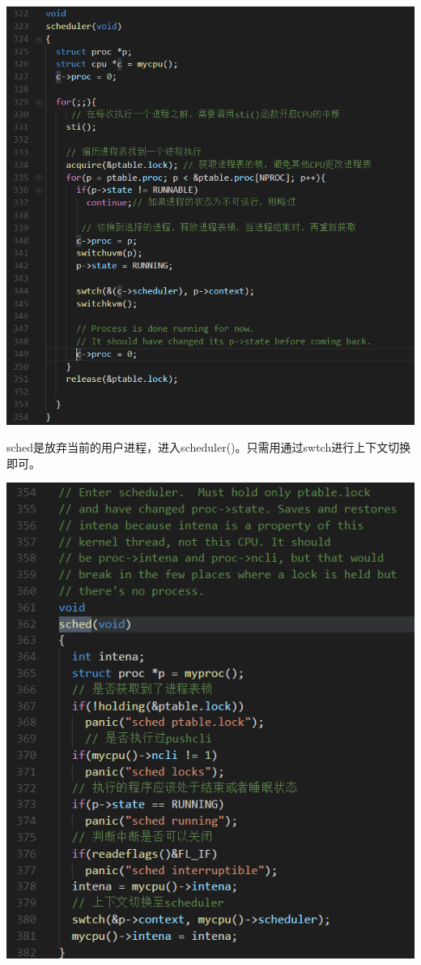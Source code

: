 \includegraphics[width=6in]{figures/process/fig9.png}

sched是放弃当前的用户进程，进入scheduler()。只需用通过swtch进行上下文切换即可。

\includegraphics[width=6in]{figures/process/fig10.png}

